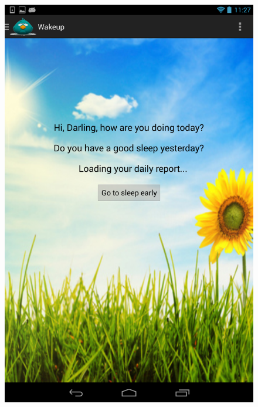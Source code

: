 \documentclass[14pt]{extreport}
\begin{document}
\begin{figure}[h]
\begin{center}
\includegraphics[width=5in]{wakeup}
\end{center}
\end{figure}
\end{document}
